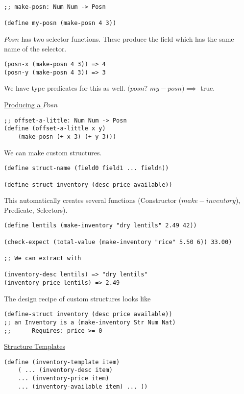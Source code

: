 \documentclass{article}
\begin{document}
\begin{lstlisting}
;; make-posn: Num Num -> Posn

(define my-posn (make-posn 4 3))
\end{lstlisting}

$Posn$ has two selector functions. These produce the field which has the same name of the selector. 

\begin{lstlisting}
(posn-x (make-posn 4 3)) => 4
(posn-y (make-posn 4 3)) => 3
\end{lstlisting}

We have type predicates for this as well. $(posn?$ $my-posn) \implies $ true.

\underline{Producing a $Posn$}

\begin{lstlisting}
;; offset-a-little: Num Num -> Posn
(define (offset-a-little x y)
    (make-posn (+ x 3) (+ y 3)))
\end{lstlisting}


We can make custom structures. 
\begin{lstlisting}
(define struct-name (field0 field1 ... fieldn))

(define-struct inventory (desc price available))
\end{lstlisting}

This automatically creates several functions (Constructor ($make-inventory$), Predicate, Selectors). 

\begin{lstlisting}
(define lentils (make-inventory "dry lentils" 2.49 42))

(check-expect (total-value (make-inventory "rice" 5.50 6)) 33.00)

;; We can extract with

(inventory-desc lentils) => "dry lentils"
(inventory-price lentils) => 2.49
\end{lstlisting}

The design recipe of custom structures looks like

\begin{lstlisting}
(define-struct inventory (desc price available))
;; an Inventory is a (make-inventory Str Num Nat)
;;      Requires: price >= 0
\end{lstlisting}

\underline{Structure Templates}

\begin{lstlisting}
(define (inventory-template item)
    ( ... (inventory-desc item)
    ... (inventory-price item)
    ... (inventory-available item) ... ))
\end{lstlisting}
\end{document}
